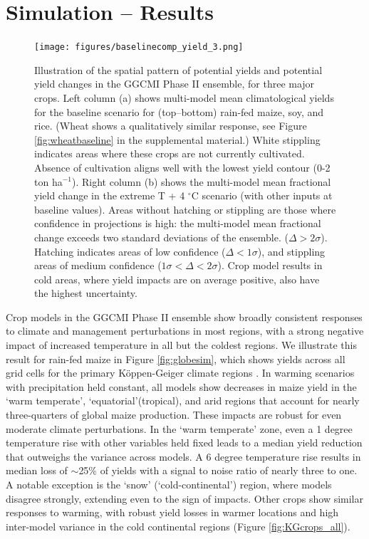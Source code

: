 \documentclass[esd, final]{copernicus} %
\begin{document}
\section{Simulation -- Results}
\label{S:3}
\begin{figure}[h]
\centering
   \texttt{[image: figures/baselinecomp\_yield\_3.png]} 
   \caption{Illustration of the spatial pattern of potential yields and potential yield changes in the GGCMI Phase II ensemble, for three major crops. Left column (a) shows multi-model mean climatological yields for the baseline scenario for (top--bottom) rain-fed maize, soy, and rice. (Wheat shows a qualitatively similar response, see Figure \ref{fig:wheatbaseline} in the supplemental material.) White stippling indicates areas where these crops are not currently cultivated. Absence of cultivation aligns well with the lowest yield contour (0-2 ton ha$^{-1}$). Right column (b) shows the multi-model mean fractional yield change in the extreme T + 4 $^{\circ}$C scenario (with other inputs at baseline values). Areas without hatching or stippling are those where confidence in projections is high: the multi-model mean fractional change exceeds two standard deviations of the ensemble. ($\Delta > 2\sigma$). Hatching indicates areas of low confidence ($\Delta < 1 \sigma$), and stippling areas of medium confidence ($1 \sigma < \Delta < 2 \sigma$). Crop model results in cold areas, where yield impacts are on average positive, also have the highest uncertainty.}
   \label{fig:maizesoybaseline}
\end{figure}

Crop models in the GGCMI Phase II ensemble show broadly consistent responses to climate and management perturbations in most regions, with a strong negative impact of increased temperature in all but the coldest regions. We illustrate this result for rain-fed maize in Figure \ref{fig:globesim}, which shows yields across all grid cells for the primary K\"{o}ppen-Geiger climate regions \citep{rubel2010}. In warming scenarios with precipitation held constant, all models show decreases in maize yield in the `warm temperate', `equatorial'(tropical), and arid regions that account for nearly three-quarters of global maize production. These impacts are robust for even moderate climate perturbations. In the `warm temperate' zone, even a 1 degree temperature rise with other variables held fixed leads to a median yield reduction that outweighs the variance across models. A 6 degree temperature rise results in median loss of $\sim$25\% of yields with a signal to noise ratio of nearly three to one. A notable exception is the `snow' (`cold-continental') region, where models disagree strongly, extending even to the sign of impacts. Other crops show similar responses to warming, with robust yield losses in warmer locations and high inter-model variance in the cold continental regions (Figure \ref{fig:KGcrops_all}).
\end{document}

